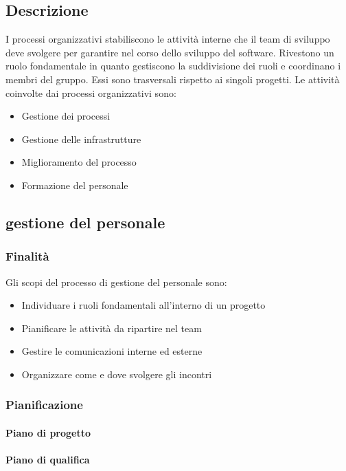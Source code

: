\documentclass[../norme-di-progetto.tex]{subfiles}
\begin{document}
\subsection{Descrizione}
\label{sub:Descrizione}
I processi organizzativi stabiliscono le attività interne che il team di sviluppo deve svolgere per garantire  nel corso dello sviluppo del software. Rivestono un ruolo fondamentale in quanto gestiscono la suddivisione dei ruoli e coordinano i membri del gruppo. Essi sono trasversali rispetto ai singoli progetti.
Le attività coinvolte dai processi organizzativi sono:
\begin{itemize}
	\item Gestione dei processi
	\item Gestione delle infrastrutture
	\item Miglioramento del processo
	\item Formazione del personale
\end{itemize}
\subsection{gestione del personale}
\label{sub:gestione del personale}
\subsubsection{Finalità}
\label{subs:finalità}
Gli scopi del processo di gestione del personale sono:
\begin{itemize}
	\item Individuare i ruoli fondamentali all'interno di un progetto
	\item Pianificare le attività da ripartire nel team
	\item Gestire le comunicazioni interne ed esterne
	\item Organizzare come e dove svolgere gli incontri
\end{itemize}
\subsubsection{Pianificazione}
\paragraph{Piano di progetto}
\label{par:piano di progetto}
\paragraph{Piano di qualifica}
\label{par:piano di qualifica}
\end{document}
